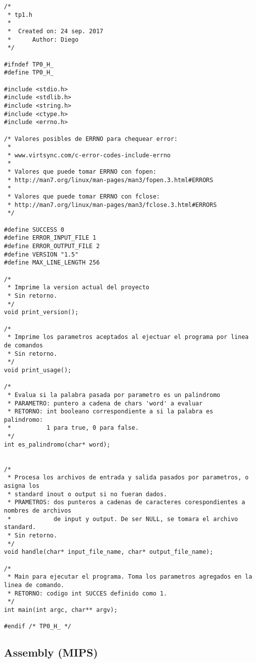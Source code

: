 \documentclass[10pt,a4paper]{article}
\begin{document}
\lstset{
	breaklines=true,
  	basicstyle=\footnotesize,
	numbers=left,
	captionpos=b,
	showspaces=false,
	title=\lstname
}

\begin{lstlisting}
/*
 * tp1.h
 *
 *  Created on: 24 sep. 2017
 *      Author: Diego
 */

#ifndef TP0_H_
#define TP0_H_

#include <stdio.h>
#include <stdlib.h>
#include <string.h>
#include <ctype.h>
#include <errno.h>

/* Valores posibles de ERRNO para chequear error:
 *
 * www.virtsync.com/c-error-codes-include-errno
 *
 * Valores que puede tomar ERRNO con fopen:
 * http://man7.org/linux/man-pages/man3/fopen.3.html#ERRORS
 *
 * Valores que puede tomar ERRNO con fclose:
 * http://man7.org/linux/man-pages/man3/fclose.3.html#ERRORS
 */

#define SUCCESS 0
#define ERROR_INPUT_FILE 1
#define ERROR_OUTPUT_FILE 2
#define VERSION "1.5"
#define MAX_LINE_LENGTH 256

/*
 * Imprime la version actual del proyecto
 * Sin retorno.
 */
void print_version();

/*
 * Imprime los parametros aceptados al ejectuar el programa por linea de comandos
 * Sin retorno.
 */
void print_usage();

/*
 * Evalua si la palabra pasada por parametro es un palindromo
 * PARAMETRO: puntero a cadena de chars 'word' a evaluar
 * RETORNO: int booleano correspondiente a si la palabra es palindromo:
 * 			1 para true, 0 para false.
 */
int es_palindromo(char* word);


/*
 * Procesa los archivos de entrada y salida pasados por parametros, o asigna los
 * standard inout o output si no fueran dados.
 * PRAMETROS: dos punteros a cadenas de caracteres corespondientes a nombres de archivos
 * 			  de input y output. De ser NULL, se tomara el archivo standard.
 * Sin retorno.
 */
void handle(char* input_file_name, char* output_file_name);

/*
 * Main para ejecutar el programa. Toma los parametros agregados en la linea de comando.
 * RETORNO: codigo int SUCCES definido como 1.
 */
int main(int argc, char** argv);

#endif /* TP0_H_ */
\end{lstlisting}

\newpage



\newpage

\subsection{Assembly (MIPS)}
\end{document}
